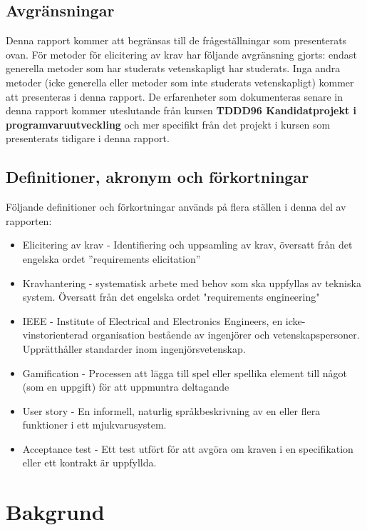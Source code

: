 \subsection{Avgränsningar}
Denna rapport kommer att begränsas till de frågeställningar som presenterats ovan. För metoder för elicitering av krav har följande avgränsning gjorts: endast generella metoder som har studerats vetenskapligt har studerats. Inga andra metoder (icke generella eller metoder som inte studerats vetenskapligt) kommer att presenteras i denna rapport. De erfarenheter som dokumenteras senare in denna rapport kommer uteslutande från kursen \textbf{TDDD96 	Kandidatprojekt i programvaruutveckling} och mer specifikt från det projekt i kursen som presenterats tidigare i denna rapport.   
\subsection{Definitioner, akronym och förkortningar}
Följande definitioner och förkortningar används på flera ställen i denna del av rapporten:
\begin{itemize}
	\item Elicitering av krav - Identifiering och uppsamling av krav, översatt från det engelska ordet ”requirements elicitation”
	\item Kravhantering - systematisk arbete med behov som ska uppfyllas av tekniska system. Översatt från det engelska ordet "requirements engineering"
	\item IEEE - Institute of Electrical and Electronics Engineers, en icke-vinstorienterad organisation bestående av ingenjörer och vetenskapspersoner. Upprätthåller standarder inom ingenjörsvetenskap.
	\item Gamification - Processen att lägga till spel eller spellika element till något (som en uppgift) för att uppmuntra deltagande
	\item User story - En informell, naturlig språkbeskrivning av en eller flera funktioner i ett mjukvarusystem.
	\item Acceptance test - Ett test utfört för att avgöra om kraven i en specifikation eller ett kontrakt är uppfyllda.
\end{itemize}
\section{Bakgrund}
\label{sec:background-jannering}

